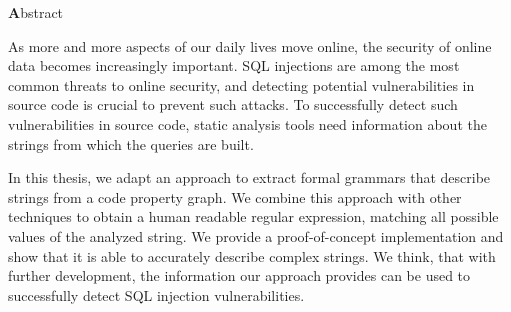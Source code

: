 \vspace*{2cm}

\begin{center}
{ \textbf Abstract}
\end{center}
\noindent


As more and more aspects of our daily lives move online, the security of online data becomes increasingly important. SQL injections are among the most common threats to online security, and detecting potential vulnerabilities in source code is crucial to prevent such attacks. To successfully detect such vulnerabilities in source code, static analysis tools need information about the strings from which the queries are built.

In this thesis, we adapt an approach to extract formal grammars that describe strings from a code property graph. We combine this approach with other techniques to obtain a human readable regular expression, matching all possible values of the analyzed string.
We provide a proof-of-concept implementation and show that it is able to accurately describe complex strings. We think, that with further development, the information our approach provides can be used to successfully detect SQL injection vulnerabilities.



\begin{comment}	

In the last couple of years, I have supervized numerous bachelor's and master's
thesis and various seminars. This led to a broad observation of typical
questions and issues the students faced when writing their thesis or papers.
Surprisingly, they are always quite similar. This template aims to give advise
to future sstudents in order to answer the most frequent questions and avoid the
most common mistakes. It provides the TUM template which has already been
accepted many times, shows the most basic outline and some tips on the contents
of each chapter. It further contains some tips on the style of scientific works.
An evaluation on a small set of students showed that this guideline can assist
in making progress faster. However, we found that we have to keep improving the
tips to achieve better results.

Your abstract goes here. The typical structure is:
\begin{itemize}
\item Broad description of the current state
\item Gap in the current state
\item Your contribution
\end{itemize}
	content...
\end{comment}